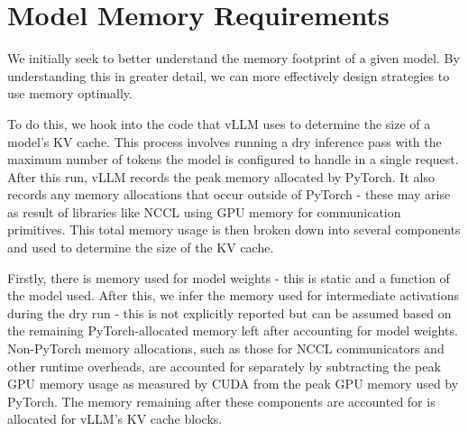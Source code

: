 \documentclass[12pt,twoside]{report}
\begin{document}
\section{Model Memory Requirements}

We initially seek to better understand the memory footprint of a given model.
By understanding this in greater detail, we can more effectively design strategies to use memory optimally.

To do this, we hook into the code that vLLM uses to determine the size of a model's KV cache.
This process involves running a dry inference pass with the maximum number of tokens the model is configured to handle in a single request.
After this run, vLLM records the peak memory allocated by PyTorch.
It also records any memory allocations that occur outside of PyTorch - these may arise as result of libraries like NCCL using GPU memory for communication primitives.
This total memory usage is then broken down into several components and used to determine the size of the KV cache.

Firstly, there is memory used for model weights - this is static and a function of the model used.
After this, we infer the memory used for intermediate activations during the dry run - this is not explicitly reported but can be assumed based on the remaining PyTorch-allocated memory left after accounting for model weights.
Non-PyTorch memory allocations, such as those for NCCL communicators and other runtime overheads, are accounted for separately by subtracting the peak GPU memory usage as measured by CUDA from the peak GPU memory used by PyTorch.
The memory remaining after these components are accounted for is allocated for vLLM's KV cache blocks.
\end{document}
